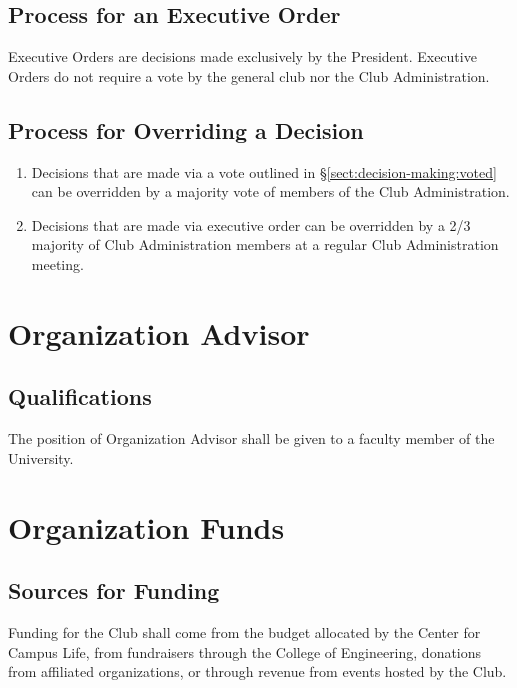 \documentclass[english,11pt]{article}
\begin{document}
\subsection{Process for an Executive Order} \label{sect:decision-making:executive-order}
Executive Orders are decisions made exclusively by the President.
Executive Orders do not require a vote by the general club nor the Club Administration.

\subsection{Process for Overriding a Decision} \label{sect:decision-making:override}
\begin{enumerate}[label=\Alph*.]
\item Decisions that are made via a vote outlined in §\ref{sect:decision-making:voted} can be overridden by a majority vote of members of the Club Administration.
\item Decisions that are made via executive order can be overridden by a 2/3 majority of Club Administration members at a regular Club Administration meeting.
\end{enumerate}

\section{Organization Advisor} \label{art:advisor}

\subsection{Qualifications} \label{sect:advisor:qualifications}
The position of Organization Advisor shall be given to a faculty member of the University.

\section{Organization Funds} \label{art:funds}

\subsection{Sources for Funding} \label{sect:funds:sources}
Funding for the Club shall come from the budget allocated by the Center for Campus Life, from fundraisers through the College of Engineering, donations from affiliated organizations, or through revenue from events hosted by the Club.
\end{document}
